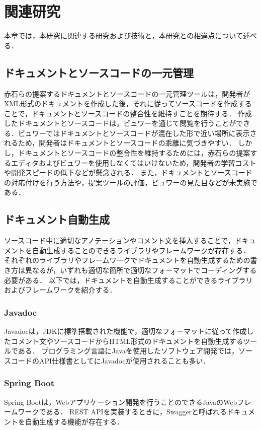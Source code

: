 \chapter{関連研究}
本章では，本研究に関連する研究および技術と，本研究との相違点について述べる．

\section{ドキュメントとソースコードの一元管理}
赤石らの提案するドキュメントとソースコードの一元管理ツールは，開発者がXML形式のドキュメントを作成した後，それに従ってソースコードを作成することで，ドキュメントとソースコードの整合性を維持すことを期待する．
作成したドキュメントとソースコードは，ビュワーを通じて閲覧を行うことができる．ビュワーではドキュメントとソースコードが混在した形で近い場所に表示されるため，開発者はドキュメントとソースコードの乖離に気づきやすい．
しかし，ドキュメントとソースコードの整合性を維持するためには，赤石らの提案するエディタおよびビュワーを使用しなくてはいけないため，開発者の学習コストや開発スピードの低下などが懸念される．
また，ドキュメントとソースコードの対応付けを行う方法や，提案ツールの評価，ビュワーの見た目などが未実施である．

\section{ドキュメント自動生成}
ソースコード中に適切なアノテーションやコメント文を挿入することで，ドキュメントを自動生成することのできるライブラリやフレームワークが存在する．
それぞれのライブラリやフレームワークでドキュメントを自動生成するための書き方は異なるが，いずれも適切な箇所で適切なフォーマットでコーディングする必要がある．
以下では，ドキュメントを自動生成することができるライブラリおよびフレームワークを紹介する．


\subsection{Javadoc}
Javadocは，JDKに標準搭載された機能で，適切なフォーマットに従って作成したコメント文やソースコードからHTML形式のドキュメントを自動生成するツールである．
プログラミング言語にJavaを使用したソフトウェア開発では，ソースコードのAPI仕様書としてにJavadocが使用されることも多い．

\subsection{Spring Boot}
Spring Bootは，Webアプリケーション開発を行うことのできるJavaのWebフレームワークである．
REST APIを実装するときに，Swaggerと呼ばれるドキュメントを自動生成する機能が存在する．

